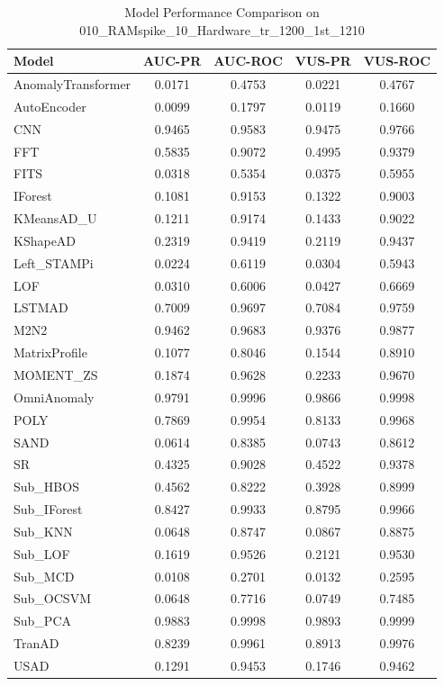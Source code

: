\documentclass[12pt,oneside]{article}
\begin{document}
\begin{table}[htbp]
    \centering
    \caption{Model Performance Comparison on 010\_RAMspike\_10\_Hardware\_tr\_1200\_1st\_1210}
    \begin{tabular}{|l|c|c|c|c|}
        \toprule
        \textbf{Model} & \textbf{AUC-PR} & \textbf{AUC-ROC} & \textbf{VUS-PR} & \textbf{VUS-ROC} \\
        \midrule
        AnomalyTransformer & 0.0171 & 0.4753 & 0.0221 & 0.4767 \\
        AutoEncoder & 0.0099 & 0.1797 & 0.0119 & 0.1660 \\
        CNN & 0.9465 & 0.9583 & 0.9475 & 0.9766 \\
        FFT & 0.5835 & 0.9072 & 0.4995 & 0.9379 \\
        FITS & 0.0318 & 0.5354 & 0.0375 & 0.5955 \\
        IForest & 0.1081 & 0.9153 & 0.1322 & 0.9003 \\
        KMeansAD\_U & 0.1211 & 0.9174 & 0.1433 & 0.9022 \\
        KShapeAD & 0.2319 & 0.9419 & 0.2119 & 0.9437 \\
        Left\_STAMPi & 0.0224 & 0.6119 & 0.0304 & 0.5943 \\
        LOF & 0.0310 & 0.6006 & 0.0427 & 0.6669 \\
        LSTMAD & 0.7009 & 0.9697 & 0.7084 & 0.9759 \\
        M2N2 & 0.9462 & 0.9683 & 0.9376 & 0.9877 \\
        MatrixProfile & 0.1077 & 0.8046 & 0.1544 & 0.8910 \\
        MOMENT\_ZS & 0.1874 & 0.9628 & 0.2233 & 0.9670 \\
        OmniAnomaly & 0.9791 & 0.9996 & 0.9866 & 0.9998 \\
        POLY & 0.7869 & 0.9954 & 0.8133 & 0.9968 \\
        SAND & 0.0614 & 0.8385 & 0.0743 & 0.8612 \\
        SR & 0.4325 & 0.9028 & 0.4522 & 0.9378 \\
        Sub\_HBOS & 0.4562 & 0.8222 & 0.3928 & 0.8999 \\
        Sub\_IForest & 0.8427 & 0.9933 & 0.8795 & 0.9966 \\
        Sub\_KNN & 0.0648 & 0.8747 & 0.0867 & 0.8875 \\
        Sub\_LOF & 0.1619 & 0.9526 & 0.2121 & 0.9530 \\
        Sub\_MCD & 0.0108 & 0.2701 & 0.0132 & 0.2595 \\
        Sub\_OCSVM & 0.0648 & 0.7716 & 0.0749 & 0.7485 \\
        Sub\_PCA & 0.9883 & 0.9998 & 0.9893 & 0.9999 \\
        TranAD & 0.8239 & 0.9961 & 0.8913 & 0.9976 \\
        USAD & 0.1291 & 0.9453 & 0.1746 & 0.9462 \\
        \bottomrule
    \end{tabular}
    
    \label{tab:model_performance_RAMspike}
\end{table}
\end{document}

